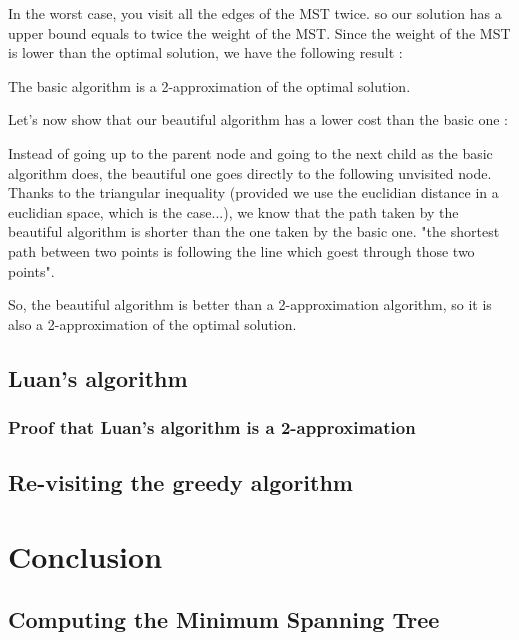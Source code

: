 \documentclass[11pt]{article}
\begin{document}
In the worst case, you visit all the edges of the MST twice. so  our solution has a upper bound equals to twice the weight of the MST.
Since the weight of the MST is lower than the optimal solution, we have the following result :

The basic algorithm is a 2-approximation of the optimal solution.


Let's now show that our beautiful algorithm has a lower cost than the basic one :

Instead of going up to the parent node and going to the next child as the basic algorithm does, the beautiful one goes directly to the following unvisited node.
Thanks to the triangular inequality (provided we use the euclidian distance in a euclidian space, which is the case...), we know that the path taken by the beautiful algorithm is shorter than the one taken by the basic one.
"the shortest path between two points is following the line which goest through those two points".

So, the beautiful algorithm is better than a 2-approximation algorithm, so it is also a 2-approximation of the optimal solution.




\subsection{Luan's algorithm}

\subsubsection{Proof that Luan's algorithm is a 2-approximation}


\subsection{Re-visiting the greedy algorithm}



\section{Conclusion}



\subsection{Computing the Minimum Spanning Tree}
\end{document}
